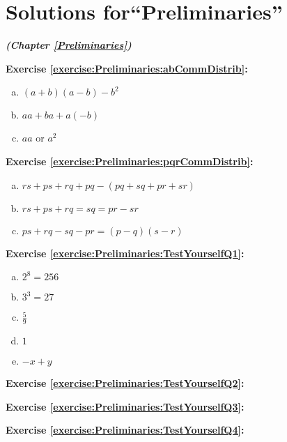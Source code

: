 \section{Solutions for``Preliminaries''}
\label{sec:AnswerKey:Preliminaries}
\noindent\textbf{\textit{ (Chapter \ref{Preliminaries})}}\bigskip


\noindent\textbf{Exercise \ref{exercise:Preliminaries:abCommDistrib}:}
\begin{enumerate}[(a)]
\item  $(a+b)(a-b) - b^2$ 
\item  $aa + ba + a(-b)$
\item  $aa$ or $a^2$
\end{enumerate}

\noindent\textbf{Exercise \ref{exercise:Preliminaries:pqrCommDistrib}:}
\begin{enumerate}[(a)]
\item  $rs + ps + rq + pq - (pq + sq + pr + sr)$ 
\item  $rs + ps + rq = sq = pr - sr$
\item  $ ps + rq - sq - pr = (p-q)(s-r)$
\end{enumerate}


\noindent\textbf{Exercise \ref{exercise:Preliminaries:TestYourselfQ1}:}
\begin{enumerate}[(a)]
\item $2^{8} = 256$
\item $3^3 = 27$
\item $\frac{5}{9}$
\item $1$
\item $-x +y$
\end{enumerate}


\noindent\textbf{Exercise \ref{exercise:Preliminaries:TestYourselfQ2}:}

\noindent\textbf{Exercise \ref{exercise:Preliminaries:TestYourselfQ3}:}

\noindent\textbf{Exercise \ref{exercise:Preliminaries:TestYourselfQ4}:}

